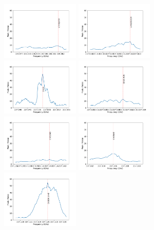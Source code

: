 \documentclass[10pt]{article}
\begin{document}
   \begin{figure}
    \includegraphics[width=0.33\textwidth]{spw0_(CH3)2CO}
    \includegraphics[width=0.33\textwidth]{spw0_c-H13CCCH}
    \includegraphics[width=0.33\textwidth]{spw0_C17O}
    \includegraphics[width=0.33\textwidth]{spw0_CH2CHCN}
    \includegraphics[width=0.33\textwidth]{spw0_CH3CHO}
    \includegraphics[width=0.33\textwidth]{spw0_CH3NH2}
    \includegraphics[width=0.33\textwidth]{spw0_CH3OHvt=0}

\end{figure}
\end{document}
